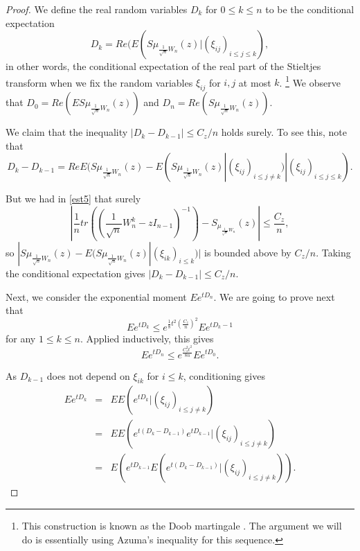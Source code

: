 \documentclass[12pt,a4paper,leqno]{report}
\theoremstyle{plain}
\theoremstyle{definition}
\theoremstyle{remark}
\begin{document}
\begin{proof}
We define the real random variables $D_k$ for $0\leq k \leq n$ to be the conditional expectation
\begin{equation*}
D_k = Re(E(S\mu_{\frac{1}{\sqrt{n}}W_n}(z)|(\xi_{ij})_{i \leq j\leq k}),
\end{equation*}
in other words, the conditional expectation of the real part of the Stieltjes transform when we fix the random variables $\xi_{ij}$ for $i,j$ at most $k$. \footnote{This construction is known as the Doob martingale \cite{Doob}. The argument we will do is essentially using Azuma's inequality \cite{Azu} for this sequence.} We observe that $D_0 = Re(ES\mu_{\frac{1}{\sqrt{n}}W_n}(z))$ and $D_n = Re(S\mu_{\frac{1}{\sqrt{n}}W_n}(z))$.

We claim that the inequality $|D_k-D_{k-1}|\leq C_z/n$ holds surely. To see this, note that
\begin{equation*}
D_k-D_{k-1} = ReE(S\mu_{\frac{1}{\sqrt{n}}W_n}(z) - E(S\mu_{\frac{1}{\sqrt{n}}W_n}(z) | (\xi_{ij})_{i \leq j \neq k}) |(\xi_{ij})_{i \leq j\leq k}).
\end{equation*}

But we had in \ref{est5} that surely 
\begin{equation*}
|\frac{1}{n}tr((\frac{1}{\sqrt{n}}W_n^k-zI_{n-1})^{-1}) - S_{\mu_{\frac{1}{\sqrt{n}}W_n}}(z)| \leq \frac{C_z}{n},
\end{equation*}
so $|S\mu_{\frac{1}{\sqrt{n}}W_n}(z) - E(S\mu_{\frac{1}{\sqrt{n}}W_n}(z)| (\xi_{ik})_{i\leq k})|$ is bounded above by $C_z/n$. Taking the conditional expectation gives $|D_k-D_{k-1}|\leq C_z/n$.

Next, we consider the exponential moment $Ee^{tD_n}$.
We are going to prove next that
\begin{equation*}
Ee^{tD_k} \leq e^{\frac{1}{8}t^2\left(\frac{C_z}{n}\right)^2} Ee^{tD_k-1}
\end{equation*}
for any $1\leq k \leq n$. Applied inductively, this gives
\begin{equation*}
Ee^{tD_n} \leq e^{\frac{C_z^2t^2}{8n}} Ee^{tD_0}.
\end{equation*}

As $D_{k-1}$ does not depend on $\xi_{ik}$ for $i\leq k$, conditioning gives
\begin{eqnarray*}
Ee^{tD_k} & = & EE(e^{tD_k}|(\xi_{ij})_{i\leq j \neq k})\\
& = & EE(e^{t(D_k-D_{k-1})}e^{tD_{k-1}}|(\xi_{ij})_{i\leq j \neq k})\\
& = & E(e^{tD_{k-1}}E(e^{t(D_k-D_{k-1})}|(\xi_{ij})_{i\leq j \neq k})).
\end{eqnarray*}


\end{proof}
\end{document}
